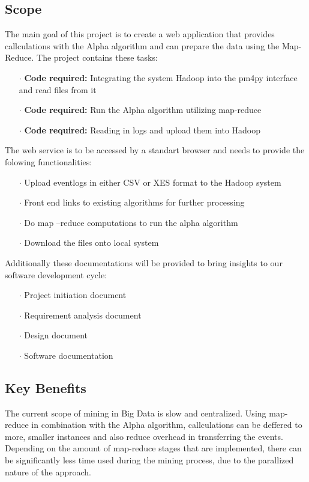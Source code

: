 \documentclass[runningheads]{llncs}
\begin{document}
\subsection{Scope}
The main goal of this project is to create a web application that provides callculations with the Alpha algorithm and can prepare the data using the Map-Reduce. The project contains these tasks:\\
\begin{itemize}
	\item[\Large $\cdot$] \textbf{Code required:} Integrating the system Hadoop into the pm4py interface and read files from it
	\item[\Large $\cdot$] \textbf{Code required:} Run the Alpha algorithm utilizing map-reduce 
	\item[\Large $\cdot$] \textbf{Code required:} Reading in logs and upload them into Hadoop
\end{itemize}
The web service is to be accessed by a standart browser and needs to provide the folowing functionalities:
\begin{itemize}
	\item[\Large $\cdot$] Upload eventlogs in either CSV or XES format to the Hadoop system
	\item[\Large $\cdot$] Front end links to existing algorithms for further processing
	\item[\Large $\cdot$] Do map –reduce computations to run the alpha algorithm
	\item[\Large $\cdot$] Download the files onto local system
\end{itemize}
Additionally these documentations will be provided to bring insights to our software development cycle:
\begin{itemize}
	\item[\Large $\cdot$]  Project initiation document
	\item[\Large $\cdot$]  Requirement analysis document
	\item[\Large $\cdot$]  Design document
	\item[\Large $\cdot$]  Software documentation
\end{itemize}
\subsection{Key Benefits}
The current scope of mining in Big Data is slow and centralized. Using map-reduce in combination with the Alpha algorithm, callculations can be deffered to more, smaller instances and also reduce overhead in transferring the events. Depending on the amount of  map-reduce stages that are implemented, there can be significantly less time used during the mining process, due to the parallized nature of the approach. \cite{mapReduce}
\end{document}
